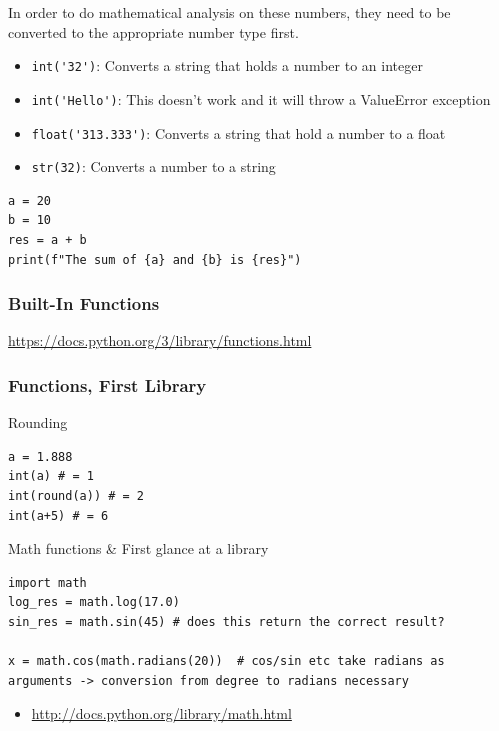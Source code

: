 \documentclass[10pt, a4paper]{beamer} %
\begin{document}
\begin{frame}
  In order to do mathematical analysis on these numbers, they need to be converted to the appropriate number type first.

  \begin{itemize}
    \item \lstinline!int('32')!: Converts a string that holds a number to an integer
    \item \lstinline!int('Hello')!: This doesn't work and it will throw a ValueError exception
    \item \lstinline!float('313.333')!: Converts a string that hold a number to a float
    \item \lstinline!str(32)!: Converts a number to a string
  \end{itemize}

  \begin{examples}
    \begin{lstlisting}
a = 20
b = 10
res = a + b
print(f"The sum of {a} and {b} is {res}")
\end{lstlisting}
  \end{examples}
\end{frame}

\begin{frame}[c]\frametitle{Built-In Functions}
  \url{https://docs.python.org/3/library/functions.html}
\end{frame}

\begin{frame}[c, fragile]\frametitle{Functions, First Library}
  \begin{block}{Rounding}
    \begin{lstlisting}
a = 1.888
int(a) # = 1
int(round(a)) # = 2
int(a+5) # = 6
    \end{lstlisting}
  \end{block}
  \begin{block}{Math functions \& First glance at a library}
    \begin{lstlisting}
import math
log_res = math.log(17.0)
sin_res = math.sin(45) # does this return the correct result?

x = math.cos(math.radians(20))  # cos/sin etc take radians as arguments -> conversion from degree to radians necessary    
  \end{lstlisting}
    \begin{itemize}
      \item \tiny \url{http://docs.python.org/library/math.html}
    \end{itemize}
  \end{block}
\end{frame}
\end{document}
